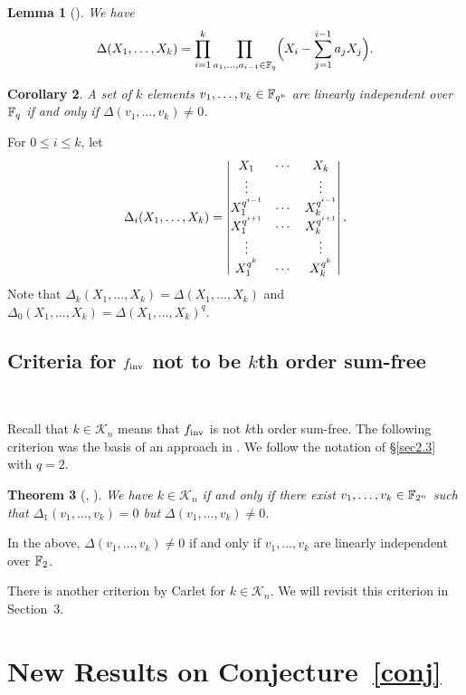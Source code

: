 \documentclass{amsart}
\newtheorem{thm}{Theorem}[section]
\newtheorem{lem}[thm]{Lemma}
\newtheorem{cor}[thm]{Corollary}
\numberwithin{equation}{section}
\theoremstyle{definition}
\newcommand{\f}{\Bbb F}
\newcommand{\fin}{f_{\text{\rm inv}}}
\begin{document}
\begin{lem}[{\cite[Lemma~3.51]{Lidl-Niederreiter-FF-1997}}]\label{Moore}
We have
\[
\Delta(X_1,\dots,X_k)=\prod_{i=1}^k\prod_{a_1,\dots,a_{i-1}\in\f_q}\Bigl(X_i-\sum_{j=1}^{i-1}a_jX_j\Bigr).
\]
\end{lem}

\begin{cor}\label{C2}
A set of $k$ elements
$v_1,\dots,v_k\in\f_{q^n}$ are linearly independent over $\f_q$ if and only if $\Delta(v_1,\dots,v_k)\ne 0$.
\end{cor}

For $0\le i\le k$, let 
\[
\Delta_i(X_1,\dots,X_k)=\left|
\begin{matrix}
X_1&\cdots&X_k\cr
\vdots&&\vdots\cr
X_1^{q^{i-1}}&\cdots&X_k^{q^{i-1}}\cr
X_1^{q^{i+1}}&\cdots&X_k^{q^{i+1}}\cr
\vdots&&\vdots\cr
X_1^{q^{k}}&\cdots&X_k^{q^{k}}
\end{matrix}\right|.
\]
Note that $\Delta_k(X_1,\dots,X_k)=\Delta(X_1,\dots,X_k)$ and $\Delta_0(X_1,\dots,X_k)=\Delta(X_1,\dots,X_k)^q$.


\subsection{Criteria for $\fin$ not to be $k$th order sum-free}\

Recall that $k\in\mathcal K_n$ means that $\fin$ is not $k$th order sum-free. The following criterion was the basis of an approach in \cite{Carlet-Hou}. We follow the notation of \S\ref{sec2.3} with $q=2$.

\begin{thm}[{\cite[Proposition~1]{Carlet-pre}, \cite[\S3.1]{Carlet-Hou}}]\label{criterion}
We have $k\in\mathcal K_n$ if and only if there exist $v_1,\dots,v_k\in\f_{2^n}$ such that $\Delta_1(v_1,\dots,v_k)=0$ but $\Delta(v_1,\dots,v_k)\ne 0$.
\end{thm}

In the above, $\Delta(v_1,\dots,v_k)\ne 0$ if and only if $v_1,\dots,v_k$ are linearly independent over $\f_2$.

There is another criterion by Carlet \cite{Carlet-pre} for $k\in\mathcal K_n$. We will revisit this criterion in Section~3.

\section{New Results on Conjecture~\ref{conj}}
\end{document}
